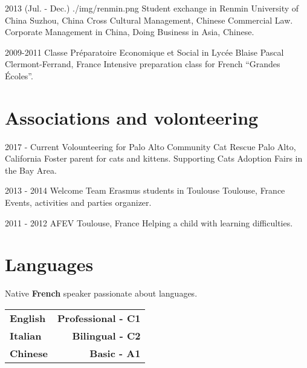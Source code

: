 \documentclass[]{cv}
\begin{document}
\begin{entrylistlogodated}
\entrylogodated
    {2013 \scriptsize{(Jul. - Dec.)}}
    {./img/renmin.png}
    {Student exchange in Renmin University of China}
    {Suzhou, China}
    {
      Cross Cultural Management, Chinese Commercial Law.\\
      Corporate Management in China, Doing Business in Asia, Chinese.
    }
\end{entrylistlogodated}

\begin{entrylistlogodated}
\entrydated
    {2009-2011}
    {Classe Pr\'eparatoire Economique et Social in Lyc\'ee Blaise Pascal}
    {Clermont-Ferrand, France}
    {
      Intensive preparation class for French ``Grandes \'Ecoles''.
    }
\end{entrylistlogodated}

\section{Associations and volonteering}
\begin{entrylistlogodated}
  \entrydated
      {2017 - Current}
      {Volounteering for Palo Alto Community Cat Rescue}
      {Palo Alto, California}
      {
        Foster parent for cats and kittens.
        Supporting Cats Adoption Fairs in the Bay Area.
      }
\end{entrylistlogodated}
\begin{entrylistlogodated}
  \entrydated
      {2013 - 2014}
      {Welcome Team Erasmus students in Toulouse}
      {Toulouse, France}
      {
        Events, activities and parties organizer.
      }
\end{entrylistlogodated}
\begin{entrylistlogodated}
  \entrydated
      {2011 - 2012}
      {AFEV}
      {Toulouse, France}
      {
        Helping a child with learning difficulties.
      }
\end{entrylistlogodated}


\section{Languages}
Native \textbf{French} speaker passionate about languages.\\
\setlength{\extrarowheight}{5pt}
\begin{tabularx}{0.42\textwidth}{X r}
  \textbf{English} & \textbf{\textcolor{airforceblue}{Professional - C1}}  \tabularnewline
  \textbf{Italian} & \textbf{\textcolor{airforceblue}{Bilingual - C2}} \tabularnewline
  \textbf{Chinese} & \textbf{\textcolor{airforceblue}{Basic - A1}} \tabularnewline
\end{tabularx}
\end{document}
